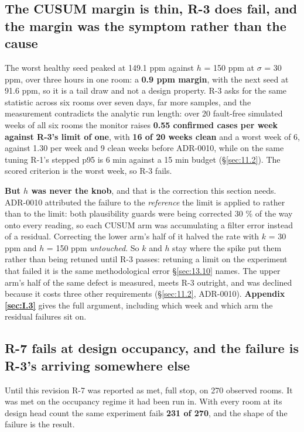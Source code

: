 \subsection{The CUSUM margin is thin, R-3 does fail, and the margin was the symptom rather
than the cause}\label{sec:13.4}
The worst healthy seed peaked at 149.1 ppm against $h$ = 150 ppm at $\sigma$ = 30 ppm, over three
hours in one room: a \textbf{0.9 ppm margin}, with the next seed at 91.6 ppm, so it is a tail draw and
not a design property. R-3 asks for the same statistic across six rooms over seven days, far more
samples, and the measurement contradicts the analytic run length: over 20 fault-free simulated weeks
of all six rooms the monitor raises \textbf{0.55 confirmed cases per week against R-3's limit of one},
with \textbf{16 of 20 weeks clean} and a worst week of 6, against 1.30 per week and 9 clean weeks
before ADR-0010, while on the same tuning R-1's stepped p95 is 6 min against a 15 min budget
(§\ref{sec:11.2}). The scored criterion is the worst week, so R-3 fails.

\textbf{But $h$ was never the knob}, and that is the correction this section needs. ADR-0010
attributed the failure to the \emph{reference} the limit is applied to rather than to the limit: both
plausibility guards were being corrected 30 \% of the way onto every reading, so each CUSUM arm was
accumulating a filter error instead of a residual. Correcting the lower arm's half of it halved the
rate with $k$ = 30 ppm and $h$ = 150 ppm \emph{untouched}. So $k$ and $h$ stay where the spike put
them rather than being retuned until R-3 passes: retuning a limit on the experiment that failed it
is the same methodological error §\ref{sec:13.10} names. The upper arm's half of the same defect is measured,
meets R-3 outright, and was declined because it costs three other requirements (§\ref{sec:11.2}, ADR-0010).
\textbf{Appendix \ref{sec:I.3}} gives the full argument, including which week and which arm the residual
failures sit on.

\subsection{R-7 fails at design occupancy, and the failure is R-3's arriving somewhere else}\label{sec:13.5}

Until this revision R-7 was reported as met, full stop, on 270 observed rooms. It was met on the
occupancy regime it had been run in. With every room at its design head count the same experiment
fails \textbf{231 of 270}, and the shape of the failure is the result.


